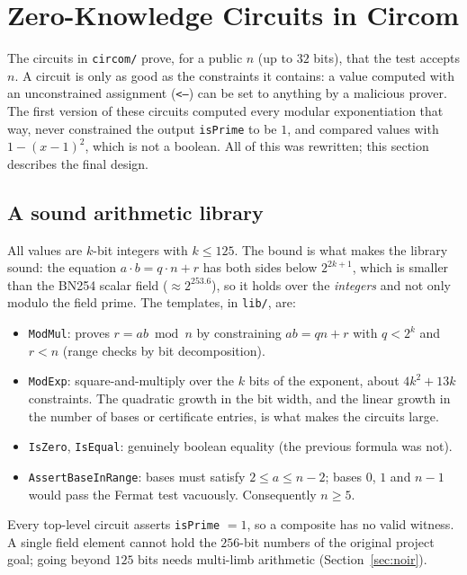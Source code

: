 \documentclass[12pt]{article}
\begin{document}
\section{Zero-Knowledge Circuits in Circom}

The circuits in \texttt{circom/} prove, for a public $n$ (up to $32$ bits), that the test accepts $n$. A circuit is only as good as the constraints it contains: a value computed with an unconstrained assignment (\texttt{<--}) can be set to anything by a malicious prover. The first version of these circuits computed every modular exponentiation that way, never constrained the output \texttt{isPrime} to be $1$, and compared values with $1-(x-1)^2$, which is not a boolean. All of this was rewritten; this section describes the final design.

\subsection*{A sound arithmetic library}

All values are $k$-bit integers with $k \le 125$. The bound is what makes the library sound: the equation $a\cdot b = q\cdot n + r$ has both sides below $2^{2k+1}$, which is smaller than the BN254 scalar field ($\approx 2^{253.6}$), so it holds over the \emph{integers} and not only modulo the field prime. The templates, in \texttt{lib/}, are:
\begin{itemize}
    \item \texttt{ModMul}: proves $r = ab \bmod n$ by constraining $ab = qn + r$ with $q < 2^k$ and $r < n$ (range checks by bit decomposition).
    \item \texttt{ModExp}: square-and-multiply over the $k$ bits of the exponent, about $4k^2 + 13k$ constraints. The quadratic growth in the bit width, and the linear growth in the number of bases or certificate entries, is what makes the circuits large.
    \item \texttt{IsZero}, \texttt{IsEqual}: genuinely boolean equality (the previous formula was not).
    \item \texttt{AssertBaseInRange}: bases must satisfy $2 \le a \le n-2$; bases $0$, $1$ and $n-1$ would pass the Fermat test vacuously. Consequently $n \ge 5$.
\end{itemize}
Every top-level circuit asserts \texttt{isPrime} $=1$, so a composite has no valid witness. A single field element cannot hold the $256$-bit numbers of the original project goal; going beyond $125$ bits needs multi-limb arithmetic (Section~\ref{sec:noir}).
\end{document}
